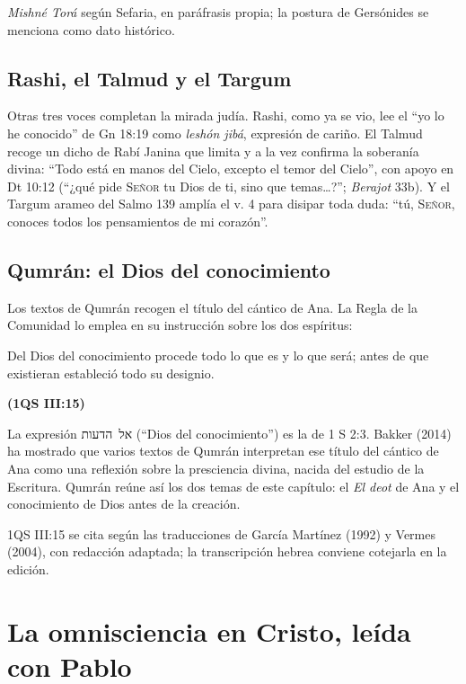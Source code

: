 \documentclass[11pt,letterpaper]{article}
\newcommand{\heb}[1]{\mbox{\foreignlanguage{hebrew}{#1}}}
\newcommand{\SENOR}{\textsc{Señor}}
\newcommand{\fuente}[1]{\par\hfill{\upshape\bfseries\small\textcolor{azul}{#1}}}
\begin{document}
\begin{nota}[Precisión]
\emph{Mishné Torá} según Sefaria, en paráfrasis propia; la postura de Gersónides se menciona como dato histórico.
\end{nota}

\subsection{Rashi, el Talmud y el Targum}
Otras tres voces completan la mirada judía. Rashi, como ya se vio, lee el ``yo lo he conocido'' de Gn 18:19 como \emph{leshón jibá}, expresión de cariño. El Talmud recoge un dicho de Rabí Janina que limita y a la vez confirma la soberanía divina: ``Todo está en manos del Cielo, excepto el temor del Cielo'', con apoyo en Dt 10:12 (``¿qué pide \SENOR{} tu Dios de ti, sino que temas\ldots?''; \emph{Berajot} 33b). Y el Targum arameo del Salmo 139 amplía el v. 4 para disipar toda duda: ``tú, \SENOR{}, conoces todos los pensamientos de mi corazón''.

\subsection{Qumrán: el Dios del conocimiento}
Los textos de Qumrán recogen el título del cántico de Ana. La Regla de la Comunidad lo emplea en su instrucción sobre los dos espíritus:

\begin{cita}Del Dios del conocimiento procede todo lo que es y lo que será; antes de que existieran estableció todo su designio.\fuente{(1QS III:15)}\end{cita}

La expresión \heb{אל הדעות} (``Dios del conocimiento'') es la de 1 S 2:3. Bakker (2014) ha mostrado que varios textos de Qumrán interpretan ese título del cántico de Ana como una reflexión sobre la presciencia divina, nacida del estudio de la Escritura. Qumrán reúne así los dos temas de este capítulo: el \emph{El deot} de Ana y el conocimiento de Dios antes de la creación.

\begin{nota}[Precisión]
1QS III:15 se cita según las traducciones de García Martínez (1992) y Vermes (2004), con redacción adaptada; la transcripción hebrea conviene cotejarla en la edición.
\end{nota}

\section{La omnisciencia en Cristo, leída con Pablo}
\end{document}

